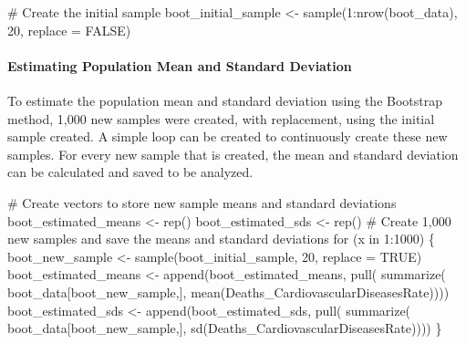 \documentclass[
  letterpaper,
  DIV=11,
  numbers=noendperiod]{scrartcl}
\let\oldparagraph\paragraph
\renewcommand{\paragraph}[1]{\oldparagraph{#1}\mbox{}}
\newenvironment{Shaded}{\begin{snugshade}}{\end{snugshade}}
\newcommand{\AttributeTok}[1]{\textcolor[rgb]{0.40,0.45,0.13}{#1}}
\newcommand{\CommentTok}[1]{\textcolor[rgb]{0.37,0.37,0.37}{#1}}
\newcommand{\ConstantTok}[1]{\textcolor[rgb]{0.56,0.35,0.01}{#1}}
\newcommand{\ControlFlowTok}[1]{\textcolor[rgb]{0.00,0.23,0.31}{#1}}
\newcommand{\DecValTok}[1]{\textcolor[rgb]{0.68,0.00,0.00}{#1}}
\newcommand{\FunctionTok}[1]{\textcolor[rgb]{0.28,0.35,0.67}{#1}}
\newcommand{\NormalTok}[1]{\textcolor[rgb]{0.00,0.23,0.31}{#1}}
\newcommand{\OtherTok}[1]{\textcolor[rgb]{0.00,0.23,0.31}{#1}}
\newcommand{\SpecialCharTok}[1]{\textcolor[rgb]{0.37,0.37,0.37}{#1}}
\begin{document}
\begin{Shaded}
\begin{Highlighting}[]
\CommentTok{\# Create the initial sample}
\NormalTok{boot\_initial\_sample }\OtherTok{\textless{}{-}} \FunctionTok{sample}\NormalTok{(}\DecValTok{1}\SpecialCharTok{:}\FunctionTok{nrow}\NormalTok{(boot\_data), }\DecValTok{20}\NormalTok{, }\AttributeTok{replace =} \ConstantTok{FALSE}\NormalTok{)}
\end{Highlighting}
\end{Shaded}

\hypertarget{estimating-population-mean-and-standard-deviation}{%
\paragraph{Estimating Population Mean and Standard
Deviation}\label{estimating-population-mean-and-standard-deviation}}

To estimate the population mean and standard deviation using the
Bootstrap method, 1,000 new samples were created, with replacement,
using the initial sample created. A simple loop can be created to
continuously create these new samples. For every new sample that is
created, the mean and standard deviation can be calculated and saved to
be analyzed.

\begin{Shaded}
\begin{Highlighting}[]
\CommentTok{\# Create vectors to store new sample means and standard deviations}
\NormalTok{boot\_estimated\_means }\OtherTok{\textless{}{-}} \FunctionTok{rep}\NormalTok{()}
\NormalTok{boot\_estimated\_sds }\OtherTok{\textless{}{-}} \FunctionTok{rep}\NormalTok{()}
\CommentTok{\# Create 1,000 new samples and save the means and standard deviations}
\ControlFlowTok{for}\NormalTok{ (x }\ControlFlowTok{in} \DecValTok{1}\SpecialCharTok{:}\DecValTok{1000}\NormalTok{) \{}
\NormalTok{  boot\_new\_sample }\OtherTok{\textless{}{-}} \FunctionTok{sample}\NormalTok{(boot\_initial\_sample, }\DecValTok{20}\NormalTok{, }\AttributeTok{replace =} \ConstantTok{TRUE}\NormalTok{)}
\NormalTok{  boot\_estimated\_means }\OtherTok{\textless{}{-}} \FunctionTok{append}\NormalTok{(boot\_estimated\_means,}
                                 \FunctionTok{pull}\NormalTok{(}
                                   \FunctionTok{summarize}\NormalTok{(}
\NormalTok{                                     boot\_data[boot\_new\_sample,], }
                                     \FunctionTok{mean}\NormalTok{(Deaths\_CardiovascularDiseasesRate))))}
\NormalTok{  boot\_estimated\_sds }\OtherTok{\textless{}{-}} \FunctionTok{append}\NormalTok{(boot\_estimated\_sds, }
                               \FunctionTok{pull}\NormalTok{(}
                                 \FunctionTok{summarize}\NormalTok{(}
\NormalTok{                                   boot\_data[boot\_new\_sample,], }
                                   \FunctionTok{sd}\NormalTok{(Deaths\_CardiovascularDiseasesRate))))}
\NormalTok{\}}
\end{Highlighting}
\end{Shaded}
\end{document}
